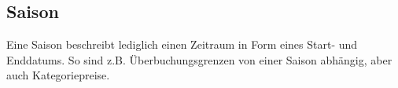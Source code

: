 \documentclass[../../Pflichtenheft.tex]{subfiles}
\begin{document}
    \subsection{Saison}
    Eine Saison beschreibt lediglich einen Zeitraum in Form eines Start- und Enddatums. So sind z.B. Überbuchungsgrenzen von einer Saison abhängig,
    aber auch Kategoriepreise.
\end{document}

